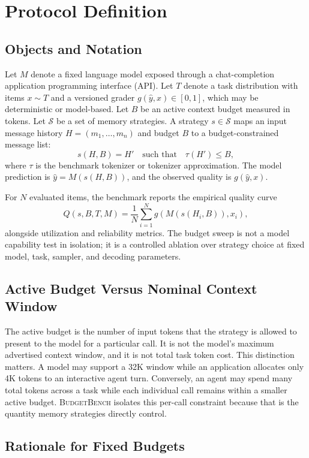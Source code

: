 \documentclass[11pt]{article}
\newcommand{\BudgetBench}{\textsc{BudgetBench}}
\begin{document}
\section{Protocol Definition}

\subsection{Objects and Notation}

Let $M$ denote a fixed language model exposed through a chat-completion
application programming interface (API).  Let $T$ denote a task distribution
with items $x \sim T$ and a versioned grader
$g(\hat{y}, x) \in [0,1]$, which may be deterministic or model-based.  Let $B$ be an active context budget measured
in tokens.  Let $\mathcal{S}$ be a set of memory strategies.  A strategy
$s \in \mathcal{S}$ maps an input message history $H = (m_1,\ldots,m_n)$ and
budget $B$ to a budget-constrained message list:
\[
  s(H, B) = H' \quad \text{such that} \quad \tau(H') \leq B,
\]
where $\tau$ is the benchmark tokenizer or tokenizer approximation.  The model
prediction is $\hat{y}=M(s(H, B))$, and the observed quality is $g(\hat{y}, x)$.

For $N$ evaluated items, the benchmark reports the empirical quality curve
\[
  Q(s, B, T, M) = \frac{1}{N}\sum_{i=1}^{N} g(M(s(H_i, B)), x_i),
\]
alongside utilization and reliability metrics.  The budget sweep is not a
model capability test in isolation; it is a controlled ablation over strategy
choice at fixed model, task, sampler, and decoding parameters.

\subsection{Active Budget Versus Nominal Context Window}

The active budget is the number of input tokens that the strategy is allowed
to present to the model for a particular call.  It is not the model's maximum
advertised context window, and it is not total task token cost.  This
distinction matters.  A model may support a 32K window while an application
allocates only 4K tokens to an interactive agent turn.  Conversely, an agent
may spend many total tokens across a task while each individual call remains
within a smaller active budget.  \BudgetBench{} isolates this per-call
constraint because that is the quantity memory strategies directly control.

\subsection{Rationale for Fixed Budgets}
\end{document}

